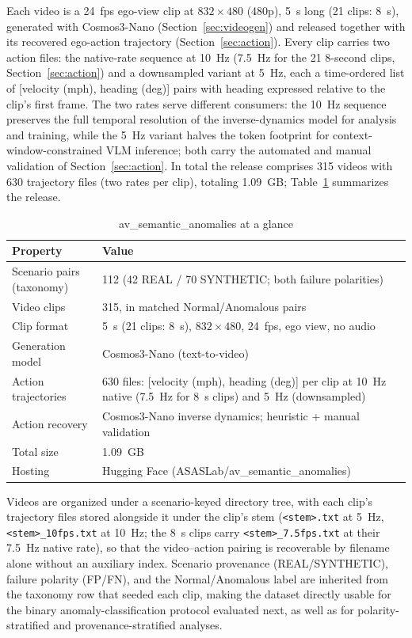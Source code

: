 \documentclass[conference]{IEEEtran}
\begin{document}
Each video is a 24~fps ego-view clip at $832\times480$ (480p), 5~s long (21 clips: 8~s), generated with Cosmos3-Nano (Section~\ref{sec:videogen}) and released together with its recovered ego-action trajectory (Section~\ref{sec:action}). Every clip carries two action files: the native-rate sequence at 10~Hz (7.5~Hz for the 21 8-second clips, Section~\ref{sec:action}) and a downsampled variant at 5~Hz, each a time-ordered list of [velocity (mph), heading (deg)] pairs with heading expressed relative to the clip's first frame. The two rates serve different consumers: the 10~Hz sequence preserves the full temporal resolution of the inverse-dynamics model for analysis and training, while the 5~Hz variant halves the token footprint for context-window-constrained VLM inference; both carry the automated and manual validation of Section~\ref{sec:action}. In total the release comprises 315 videos with 630 trajectory files (two rates per clip), totaling 1.09~GB; Table~\ref{tab:dataset} summarizes the release.

\begin{table}[htbp]
\caption{av\_semantic\_anomalies at a glance}
\begin{center}
\small
\begin{tabular}{|l|p{4.6cm}|}
\hline
\textbf{Property} & \textbf{Value} \\
\hline
Scenario pairs (taxonomy) & 112 (42 REAL / 70 SYNTHETIC; both failure polarities) \\
\hline
Video clips & 315, in matched Normal/Anomalous pairs \\
\hline
Clip format & 5~s (21 clips: 8~s), $832\times480$, 24~fps, ego view, no audio \\
\hline
Generation model & Cosmos3-Nano (text-to-video) \\
\hline
Action trajectories & 630 files: [velocity (mph), heading (deg)] per clip at 10~Hz native (7.5~Hz for 8~s clips) and 5~Hz (downsampled) \\
\hline
Action recovery & Cosmos3-Nano inverse dynamics; heuristic + manual validation \\
\hline
Total size & 1.09~GB \\
\hline
Hosting & Hugging Face (ASASLab/av\_semantic\_anomalies) \\
\hline
\end{tabular}
\label{tab:dataset}
\end{center}
\end{table}

Videos are organized under a scenario-keyed directory tree, with each clip's trajectory files stored alongside it under the clip's stem (\texttt{<stem>.txt} at 5~Hz, \texttt{<stem>\_10fps.txt} at 10~Hz; the 8~s clips carry \texttt{<stem>\_7.5fps.txt} at their 7.5~Hz native rate), so that the video--action pairing is recoverable by filename alone without an auxiliary index. Scenario provenance (REAL/SYNTHETIC), failure polarity (FP/FN), and the Normal/Anomalous label are inherited from the taxonomy row that seeded each clip, making the dataset directly usable for the binary anomaly-classification protocol evaluated next, as well as for polarity-stratified and provenance-stratified analyses.
\end{document}
